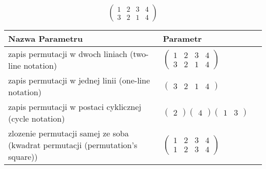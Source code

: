 \documentclass[12pt]{article}
\begin{document}
\subsection{}
\begin{center}
\[
\begin{pmatrix}
	1 & 2 & 3 & 4 \\ 
	3 & 2 & 1 & 4 
\end{pmatrix}
\]

\begin{tabular}{|m{0.6\linewidth}|m{0.4\linewidth}|}
	\hline
	Nazwa Parametru & Parametr \\
	\hline
	zapis permutacji w dwoch liniach (two-line notation) & $\begin{pmatrix} 1 & 2 & 3 & 4 \\ 
3 & 2 & 1 & 4 \end{pmatrix}$ \\ 
	\hline
	zapis permutacji w jednej linii (one-line notation) & $\begin{pmatrix} 3 & 2 & 1 & 4 \end{pmatrix}$ \\ 
	\hline
	zapis permutacji w postaci cyklicznej (cycle notation) & $\begin{pmatrix} 2 \end{pmatrix} \begin{pmatrix} 4 \end{pmatrix} \begin{pmatrix} 1 & 3 \end{pmatrix} $ \\ 
	\hline
	zlozenie permutacji samej ze soba (kwadrat permutacji (permutation's square)) & $\begin{pmatrix} 1 & 2 & 3 & 4 \\ 
1 & 2 & 3 & 4 \end{pmatrix}$ \\ 
	\hline
\end{tabular}
\end{center}
\end{document}
